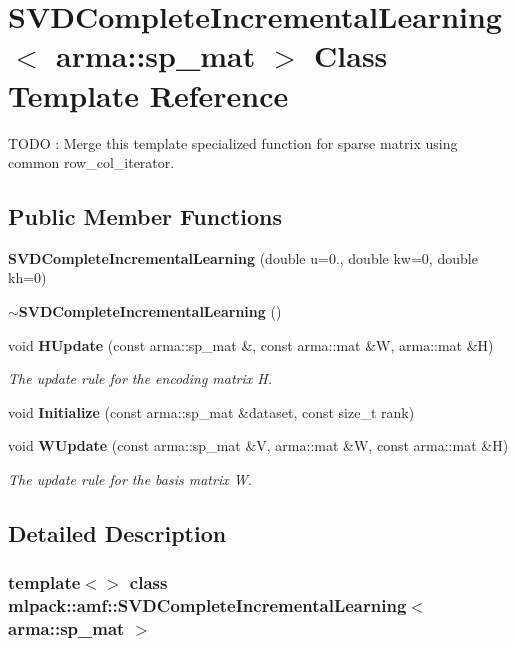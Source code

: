 \section{S\+V\+D\+Complete\+Incremental\+Learning$<$ arma\+:\+:sp\+\_\+mat $>$ Class Template Reference}
\label{classmlpack_1_1amf_1_1SVDCompleteIncrementalLearning_3_01arma_1_1sp__mat_01_4}


T\+O\+DO \+: Merge this template specialized function for sparse matrix using common row\+\_\+col\+\_\+iterator.  


\subsection*{Public Member Functions}
\begin{DoxyCompactItemize}
\item 
\textbf{ S\+V\+D\+Complete\+Incremental\+Learning} (double u=0., double kw=0, double kh=0)
\item 
\textbf{ $\sim$\+S\+V\+D\+Complete\+Incremental\+Learning} ()
\item 
void \textbf{ H\+Update} (const arma\+::sp\+\_\+mat \&, const arma\+::mat \&W, arma\+::mat \&H)
\begin{DoxyCompactList}\small\item\em The update rule for the encoding matrix H. \end{DoxyCompactList}\item 
void \textbf{ Initialize} (const arma\+::sp\+\_\+mat \&dataset, const size\+\_\+t rank)
\item 
void \textbf{ W\+Update} (const arma\+::sp\+\_\+mat \&V, arma\+::mat \&W, const arma\+::mat \&H)
\begin{DoxyCompactList}\small\item\em The update rule for the basis matrix W. \end{DoxyCompactList}\end{DoxyCompactItemize}


\subsection{Detailed Description}
\subsubsection*{template$<$$>$\newline
class mlpack\+::amf\+::\+S\+V\+D\+Complete\+Incremental\+Learning$<$ arma\+::sp\+\_\+mat $>$}

